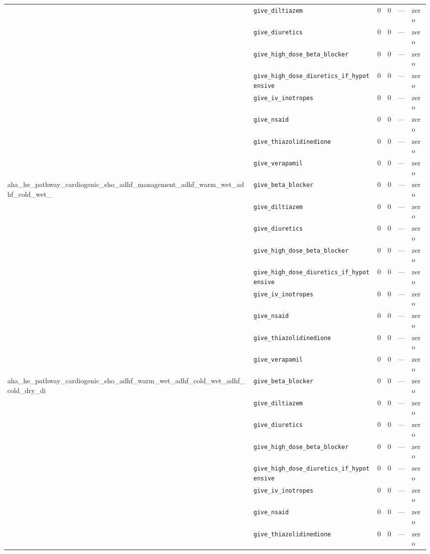 \begin{table}[ht]
\begin{tabular}{llrrrl}
 & \texttt{give\_diltiazem} & 0 & 0 & — & zero \\
 & \texttt{give\_diuretics} & 0 & 0 & — & zero \\
 & \texttt{give\_high\_dose\_beta\_blocker} & 0 & 0 & — & zero \\
 & \texttt{give\_high\_dose\_diuretics\_if\_hypotensive} & 0 & 0 & — & zero \\
 & \texttt{give\_iv\_inotropes} & 0 & 0 & — & zero \\
 & \texttt{give\_nsaid} & 0 & 0 & — & zero \\
 & \texttt{give\_thiazolidinedione} & 0 & 0 & — & zero \\
 & \texttt{give\_verapamil} & 0 & 0 & — & zero \\
\midrule
aha\_he\_pathway\_cardiogenic\_sho\_adhf\_management\_adhf\_warm\_wet\_adhf\_cold\_wet\_ & \texttt{give\_beta\_blocker} & 0 & 0 & — & zero \\
 & \texttt{give\_diltiazem} & 0 & 0 & — & zero \\
 & \texttt{give\_diuretics} & 0 & 0 & — & zero \\
 & \texttt{give\_high\_dose\_beta\_blocker} & 0 & 0 & — & zero \\
 & \texttt{give\_high\_dose\_diuretics\_if\_hypotensive} & 0 & 0 & — & zero \\
 & \texttt{give\_iv\_inotropes} & 0 & 0 & — & zero \\
 & \texttt{give\_nsaid} & 0 & 0 & — & zero \\
 & \texttt{give\_thiazolidinedione} & 0 & 0 & — & zero \\
 & \texttt{give\_verapamil} & 0 & 0 & — & zero \\
\midrule
aha\_he\_pathway\_cardiogenic\_sho\_adhf\_warm\_wet\_adhf\_cold\_wet\_adhf\_cold\_dry\_di & \texttt{give\_beta\_blocker} & 0 & 0 & — & zero \\
 & \texttt{give\_diltiazem} & 0 & 0 & — & zero \\
 & \texttt{give\_diuretics} & 0 & 0 & — & zero \\
 & \texttt{give\_high\_dose\_beta\_blocker} & 0 & 0 & — & zero \\
 & \texttt{give\_high\_dose\_diuretics\_if\_hypotensive} & 0 & 0 & — & zero \\
 & \texttt{give\_iv\_inotropes} & 0 & 0 & — & zero \\
 & \texttt{give\_nsaid} & 0 & 0 & — & zero \\
 & \texttt{give\_thiazolidinedione} & 0 & 0 & — & zero \\

\end{tabular}
\end{table}
